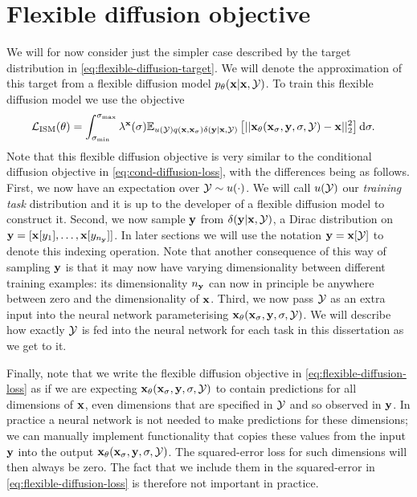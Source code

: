 \section{Flexible diffusion objective}
We will for now consider just the simpler case described by the target distribution in \cref{eq:flexible-diffusion-target}. We will denote the approximation of this target from a flexible diffusion model $p_\theta({\mathbf{x}}|{\mathbf{x}},{\mathcal{Y}})$. To train this flexible diffusion model we use the objective
\begin{align} \label{eq:flexible-diffusion-loss}
    \mathcal{L}_\text{ISM}(\theta) &= \int_{\sigma_\text{min}}^{\sigma_\text{max}} \lambda^{\mathbf{x}}(\sigma) \mathbb{E}_{u({\mathcal{Y}})q({\mathbf{x}}, {\mathbf{x}}_\sigma)\delta({\mathbf{y}}|{\mathbf{x}},{\mathcal{Y}})} \left[ 
    || {\mathbf{x}}_\theta({\mathbf{x}}_\sigma, {\mathbf{y}}, \sigma, {\mathcal{Y}}) - {\mathbf{x}} ||_2^2 \right] \mathrm{d}\sigma.
\end{align}
Note that this flexible diffusion objective is very similar to the conditional diffusion objective in \cref{eq:cond-diffusion-loss}, with the differences being as follows. First, we now have an expectation over ${\mathcal{Y}} \sim u(\cdot)$. We will call $u({\mathcal{Y}})$ our \textit{training task} distribution and it is up to the developer of a flexible diffusion model to construct it. Second, we now sample ${\mathbf{y}}$ from $\delta({\mathbf{y}}|{\mathbf{x}},{\mathcal{Y}})$, a Dirac distribution on ${\mathbf{y}} = [ {\mathbf{x}}[y_1], \ldots, {\mathbf{x}}[y_{n_{\mathbf{y}}}] ]$. In later sections we will use the notation ${\mathbf{y}} = {\mathbf{x}}[{\mathcal{Y}}]$ to denote this indexing operation. Note that another consequence of this way of sampling ${\mathbf{y}}$ is that it may now have varying dimensionality between different training examples: its dimensionality $n_{\mathbf{y}}$ can now in principle be anywhere between zero and the dimensionality of ${\mathbf{x}}$. Third, we now pass ${\mathcal{Y}}$ as an extra input into the neural network parameterising ${\mathbf{x}}_\theta({\mathbf{x}}_\sigma, {\mathbf{y}}, \sigma, {\mathcal{Y}})$. We will describe how exactly ${\mathcal{Y}}$ is fed into the neural network for each task in this dissertation as we get to it.

Finally, note that we write the flexible diffusion objective in  \cref{eq:flexible-diffusion-loss} as if we are expecting ${\mathbf{x}}_\theta({\mathbf{x}}_\sigma, {\mathbf{y}}, \sigma, {\mathcal{Y}})$ to contain predictions for all dimensions of ${\mathbf{x}}$, even dimensions that are specified in ${\mathcal{Y}}$ and so observed in ${\mathbf{y}}$. In practice a neural network is not needed to make predictions for these dimensions; we can manually implement functionality that copies these values from the input ${\mathbf{y}}$ into the output ${\mathbf{x}}_\theta({\mathbf{x}}_\sigma, {\mathbf{y}}, \sigma, {\mathcal{Y}})$. The squared-error loss for such dimensions will then always be zero. The fact that we include them in the squared-error in \cref{eq:flexible-diffusion-loss} is therefore not important in practice.


